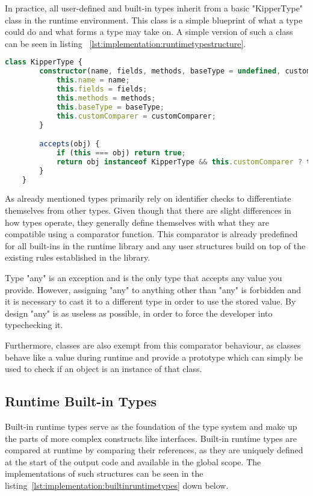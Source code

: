In practice, all user-defined and built-in types inherit from a basic "KipperType" class in the runtime environment. This class is a simple blueprint of what a type could do and what forms a type may take on. A simple version of such a class can be seen in listing ~\ref{lst:implementation:runtimetypestructure}.

\begin{lstlisting}[language=TypeScript,caption=The structure of a runtime type,label=lst:implementation:runtimetypestructure]
	class KipperType {
		constructor(name, fields, methods, baseType = undefined, customComparer = undefined) {
			this.name = name;
			this.fields = fields;
			this.methods = methods;
			this.baseType = baseType;
			this.customComparer = customComparer;
		}

		accepts(obj) {
			if (this === obj) return true;
			return obj instanceof KipperType && this.customComparer ? this.customComparer(this, obj) : false;
		}
	}
\end{lstlisting}

As already mentioned types primarily rely on identifier checks to differentiate themselves from other types. Given though that there are slight differences in how types operate, they generally define themselves with what they are compatible using a comparator function. This comparator is already predefined for all built-ins in the runtime library and any user structures build on top of the existing rules established in the library.

Type "any" is an exception and is the only type that accepts any value you provide. However, assigning "any" to anything other than "any" is forbidden and it is necessary to cast it to a different type in order to use the stored value. By design "any" is as useless as possible, in order to force the developer into typechecking it.

Furthermore, classes are also exempt from this comparator behaviour, as classes behave like a value during runtime and provide a prototype which can simply be used to check if an object is an instance of that class.

\subsection{Runtime Built-in Types}

Built-in runtime types serve as the foundation of the type system and make up the parts of more complex constructs like interfaces. Built-in runtime types are compared at runtime by comparing their references, as they are uniquely defined at the start of the output code and available in the global scope. The implementations of such structures can be seen in the listing~\ref{lst:implementation:builtinruntimetypes} down below.

